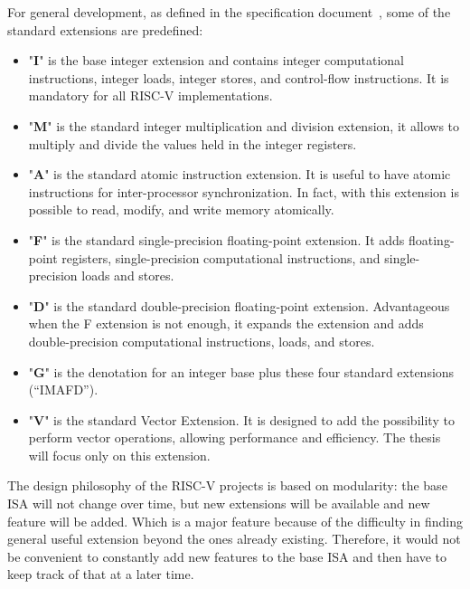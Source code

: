 For general development, as defined in the specification document~\cite{RISC-V-Instruction-Set-Manual}, some of the standard extensions are predefined:
\begin{itemize}
    \item "\textbf{I}" is the base integer extension and contains integer computational instructions, integer loads, integer stores, and control-ﬂow instructions. It is mandatory for all RISC-V implementations.
    
    \item "\textbf{M}" is the standard integer multiplication and division extension, it allows to multiply and divide the values held in the integer registers.
    
    \item "\textbf{A}" is the standard atomic instruction extension. It is useful to have atomic instructions for inter-processor synchronization. In fact, with this extension is possible to read, modify, and write memory atomically. 
    
    \item "\textbf{F}" is the standard single-precision ﬂoating-point extension. It adds ﬂoating-point registers, single-precision computational instructions, and single-precision loads and stores. 
    
    \item "\textbf{D}" is the standard double-precision ﬂoating-point extension. Advantageous when the F extension is not enough, it expands the extension and adds double-precision computational instructions, loads, and stores.
    
    \item "\textbf{G}" is the denotation for an integer base plus these four standard extensions (“IMAFD”).
    
    \item "\textbf{V}" is the standard Vector Extension. It is designed to add the possibility to perform vector operations, allowing performance and efficiency. The thesis will focus only on this extension.
\end{itemize}


The design philosophy of the RISC-V projects is based on modularity: the base ISA will not change over time, but new extensions will be available and new feature will be added. Which is a major feature because of the difficulty in finding general useful extension beyond the ones already existing. Therefore, it would not be convenient to constantly add new features to the base ISA and then have to keep track of that at a later time.


